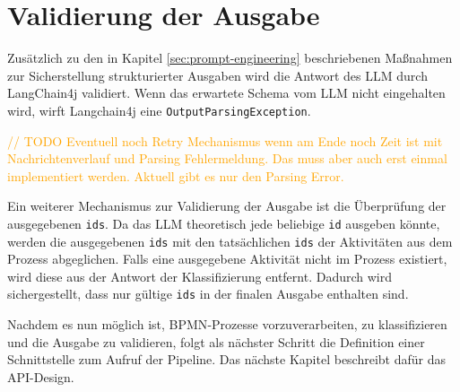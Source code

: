 \section{Validierung der Ausgabe}\label{sec:validierung-der-ausgabe}

Zusätzlich zu den in Kapitel \ref{sec:prompt-engineering} beschriebenen Maßnahmen zur Sicherstellung strukturierter Ausgaben wird die Antwort des \ac{LLM} durch LangChain4j validiert. Wenn das erwartete Schema vom \ac{LLM} nicht eingehalten wird, wirft Langchain4j eine \texttt{OutputParsingException}.

\textcolor{orange}{// TODO Eventuell noch Retry Mechanismus wenn am Ende noch Zeit ist mit Nachrichtenverlauf und Parsing Fehlermeldung. Das muss aber auch erst einmal implementiert werden. Aktuell gibt es nur den Parsing Error.}

Ein weiterer Mechanismus zur Validierung der Ausgabe ist die Überprüfung der ausgegebenen \texttt{ids}. Da das \ac{LLM} theoretisch jede beliebige \texttt{id} ausgeben könnte, werden die ausgegebenen \texttt{ids} mit den tatsächlichen \texttt{ids} der Aktivitäten aus dem Prozess abgeglichen. Falls eine ausgegebene Aktivität nicht im Prozess existiert, wird diese aus der Antwort der Klassifizierung entfernt. Dadurch wird sichergestellt, dass nur gültige \texttt{ids} in der finalen Ausgabe enthalten sind.

Nachdem es nun möglich ist, \ac{BPMN}-Prozesse vorzuverarbeiten, zu klassifizieren und die Ausgabe zu validieren, folgt als nächster Schritt die Definition einer Schnittstelle zum Aufruf der Pipeline. Das nächste Kapitel beschreibt dafür das API-Design.